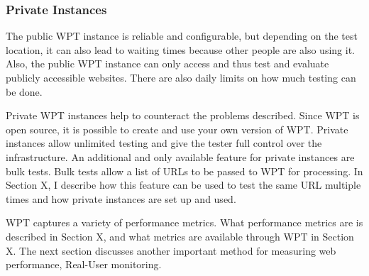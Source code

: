 \subsubsection{Private Instances} %

The public WPT instance is reliable and configurable, but depending on the test location, it can also lead to waiting times because other people are also using it.
Also, the public WPT instance can only access and thus test and evaluate publicly accessible websites. %
There are also daily limits on how much testing can be done.

Private WPT instances help to counteract the problems described.
Since WPT is open source, it is possible to create and use your own version of WPT.
Private instances allow unlimited testing and give the tester full control over the infrastructure.
An additional and only available feature for private instances are bulk tests.
Bulk tests allow a list of URLs to be passed to WPT for processing.
In Section X, I describe how this feature can be used to test the same URL multiple times and how private instances are set up and used.


WPT captures a variety of performance metrics.
What performance metrics are is described in Section X, and what metrics are available through WPT in Section X.
The next section discusses another important method for measuring web performance, Real-User monitoring.






